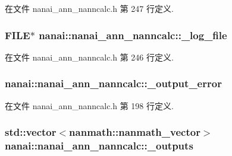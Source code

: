 在文件 nanai\+\_\+ann\+\_\+nanncalc.\+h 第 247 行定义.

\hypertarget{classnanai_1_1nanai__ann__nanncalc_ad7f1e9a64ffdf10347e0f7175a73103c}{}
\subsubsection[{\+\_\+log\+\_\+file}]{\setlength{\rightskip}{0pt plus 5cm}F\+I\+L\+E$\ast$ nanai\+::nanai\+\_\+ann\+\_\+nanncalc\+::\+\_\+log\+\_\+file\hspace{0.3cm}{\ttfamily [protected]}}\label{classnanai_1_1nanai__ann__nanncalc_ad7f1e9a64ffdf10347e0f7175a73103c}


在文件 nanai\+\_\+ann\+\_\+nanncalc.\+h 第 246 行定义.

\hypertarget{classnanai_1_1nanai__ann__nanncalc_abee00d840fe641d5c69aa1c621333179}{}
\subsubsection[{\+\_\+output\+\_\+error}]{ nanai\+::nanai\+\_\+ann\+\_\+nanncalc\+::\+\_\+output\+\_\+error\hspace{0.3cm}{\ttfamily [protected]}}\label{classnanai_1_1nanai__ann__nanncalc_abee00d840fe641d5c69aa1c621333179}


在文件 nanai\+\_\+ann\+\_\+nanncalc.\+h 第 198 行定义.

\hypertarget{classnanai_1_1nanai__ann__nanncalc_a6d00ff0323ee2fd5c1cfbd0f775da125}{}
\subsubsection[{\+\_\+outputs}]{\setlength{\rightskip}{0pt plus 5cm}std\+::vector$<${\bf nanmath\+::nanmath\+\_\+vector}$>$ nanai\+::nanai\+\_\+ann\+\_\+nanncalc\+::\+\_\+outputs\hspace{0.3cm}{\ttfamily [protected]}}\label{classnanai_1_1nanai__ann__nanncalc_a6d00ff0323ee2fd5c1cfbd0f775da125}


